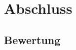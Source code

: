 %



\chapter{Abschluss}
\label{Kapitel:Abschluss}





\section{Bewertung}
\label{Abschnitt:Abschluss:Bewertung}






